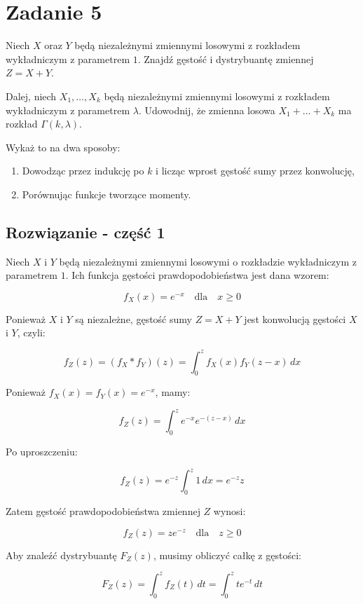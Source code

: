 \section{Zadanie 5}\label{set09.task05}
Niech \( X \) oraz \( Y \) będą niezależnymi zmiennymi losowymi z rozkładem wykładniczym z parametrem \( 1 \). Znajdź gęstość i dystrybuantę zmiennej \( Z = X + Y \).

Dalej, niech \( X_1, \dots, X_k \) będą niezależnymi zmiennymi losowymi z rozkładem wykładniczym z parametrem \( \lambda \). Udowodnij, że zmienna losowa \( X_1 + \dots + X_k \) ma rozkład \( \Gamma(k, \lambda) \).

Wykaż to na dwa sposoby:
\begin{enumerate}
	\item Dowodząc przez indukcję po \( k \) i licząc wprost gęstość sumy przez konwolucję,
	\item Porównując funkcje tworzące momenty.
\end{enumerate}

\subsection*{Rozwiązanie - część 1}

Niech \( X \) i \( Y \) będą niezależnymi zmiennymi losowymi o rozkładzie wykładniczym z parametrem \( 1 \). Ich funkcja gęstości prawdopodobieństwa jest dana wzorem:

\[
	f_X(x) = e^{-x} \quad \text{dla} \quad x \geq 0
\]

Ponieważ \( X \) i \( Y \) są niezależne, gęstość sumy \( Z = X + Y \) jest konwolucją gęstości \( X \) i \( Y \), czyli:

\[
	f_Z(z) = (f_X * f_Y)(z) = \int_{0}^{z} f_X(x) f_Y(z-x) \, dx
\]

Ponieważ \( f_X(x) = f_Y(x) = e^{-x} \), mamy:

\[
	f_Z(z) = \int_0^z e^{-x} e^{-(z-x)} \, dx
\]

Po uproszczeniu:

\[
	f_Z(z) = e^{-z} \int_0^z 1 \, dx = e^{-z} z
\]

Zatem gęstość prawdopodobieństwa zmiennej \( Z \) wynosi:

\[
	f_Z(z) = z e^{-z} \quad \text{dla} \quad z \geq 0
\]

Aby znaleźć dystrybuantę \( F_Z(z) \), musimy obliczyć całkę z gęstości:

\[
	F_Z(z) = \int_0^z f_Z(t) \, dt = \int_0^z t e^{-t} \, dt
\]

